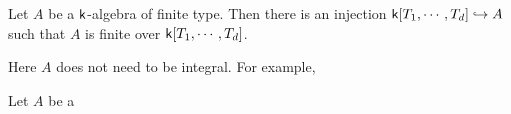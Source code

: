         \begin{theorem}\label{thm: Noether's Normalization Lemma}
            Let $A$ be a ${\mathsf{k}}$-algebra of finite type.
            Then there is an injection ${\mathsf{k}}[T_1,\cdots,T_d] \hookrightarrow A$ such that $A$ is finite over ${\mathsf{k}}[T_1,\cdots,T_d]$.
        \end{theorem}

        \begin{remark}
            Here $A$ does not need to be integral. 
            For example, 
        \end{remark}

        \begin{theorem}\label{thm: Nullstellensatz}
            Let $A$ be a 
        \end{theorem}
